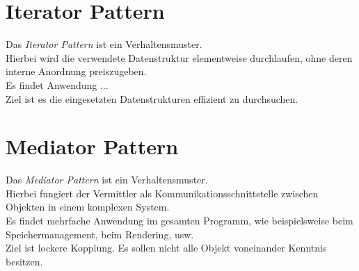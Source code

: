 \documentclass[10pt]{scrreprt}
\begin{document}
\section{Iterator Pattern}
Das \textit{Iterator Pattern} ist ein Verhaltensmuster. \\ Hierbei wird die verwendete Datenstruktur elementweise durchlaufen, ohne deren interne Anordnung preiszugeben.\\ Es findet Anwendung ... \\ Ziel ist es die eingesetzten Datenstrukturen effizient zu durchsuchen.

\newpage
\section{Mediator Pattern}
Das \textit{Mediator Pattern} ist ein Verhaltensmuster. \\ Hierbei fungiert der Vermittler als Kommunikationsschnittstelle zwischen Objekten in einem komplexen System. \\ Es findet mehrfache Anwendung im gesamten Programm, wie beispielsweise beim Speichermanagement, beim Rendering, usw. \\ Ziel ist lockere Kopplung. Es sollen nicht alle Objekt voneinander Kenntnis besitzen.
\end{document}
